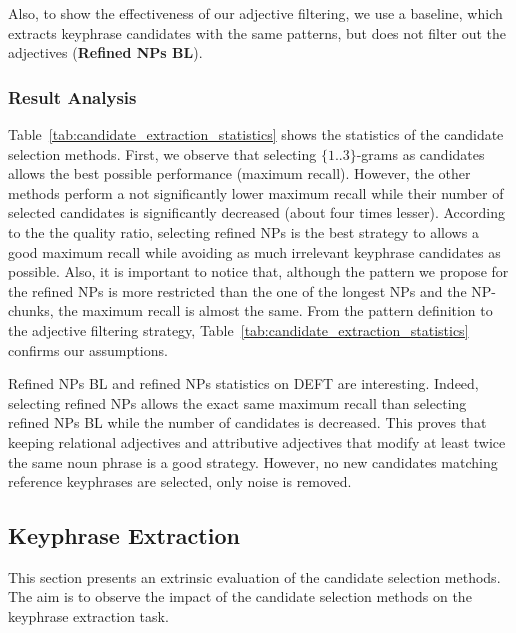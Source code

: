       Also, to show the effectiveness of our adjective filtering, we use a
      baseline, which extracts keyphrase candidates with the same patterns, but
      does not filter out the adjectives (\textbf{Refined NPs BL}).

    \subsubsection{Result Analysis}
    \label{subsubsec:candidate_extraction_result_analysis}
      Table~\ref{tab:candidate_extraction_statistics} shows the statistics of
      the candidate selection methods. First, we observe that selecting
      $\{1..3\}$-grams as candidates allows the best possible performance
      (maximum recall). However, the other methods perform  a not significantly
      lower maximum recall while their number of selected candidates is
      significantly decreased (about four times lesser). According to the the
      quality ratio, selecting refined NPs is the best strategy to allows a good
      maximum recall while avoiding as much irrelevant keyphrase candidates as
      possible. Also, it is important to notice that, although the pattern we
      propose for the refined NPs is more restricted than the one of the longest
      NPs and the NP-chunks, the maximum recall is almost the same. From the
      pattern definition to the adjective filtering strategy,
      Table~\ref{tab:candidate_extraction_statistics} confirms our assumptions.

      Refined NPs BL and refined NPs statistics on DEFT are interesting. Indeed,
      selecting refined NPs allows the exact same maximum recall than selecting
      refined NPs BL while the number of candidates is decreased. This proves
      that keeping relational adjectives and attributive adjectives that modify
      at least twice the same noun phrase is a good strategy. However, no new
      candidates matching reference keyphrases are selected, only noise is
      removed.

  \subsection{Keyphrase Extraction}
  \label{subsec:keyphrase_extraction}
    This section presents an extrinsic evaluation of the candidate selection
    methods. The aim is to observe the impact of the candidate selection
    methods on the keyphrase extraction task.

